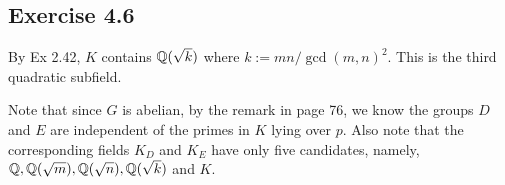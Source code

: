 \documentclass[../Marcus.tex]{subfiles}
\begin{document}
\begin{comment}
It's remaining to show that $H$ is normal in $G$. Note that for each $\sigma\in G$, $\sigma H\sigma^{-1}$ forms another subgroup with $\#(\sigma H\sigma^{-1})=\#(H)$. And by the uniqueness, we have $\sigma H\sigma^{-1}=H$. This means $H$ is normal in $G$.

Let's show the groups have the desired properties. If there are distinct prime divisors $p,q$ of $\#(G)$, then by Cauchy's theorem, $\exists \sigma,\tau\in G$ with order $p,q$, respectively. Since $H$ is the smallest subgroup, $H\subseteq \langle\sigma\rangle,\langle\tau\rangle$. This implies $\#(H)\mid p,q$ and so $\#(H)=1$, which is absurd. So $\#(G)$ is a prime power. Consequently, $H$ must have prime order. Lastly, $H\subset Z(G)$ is clear.

(e) Similar to (d), we assume there's at least one intermediate field $K'$. And let $K'$ be the compositum of all intermediate fields, $H$ be the corresponding subgroup in $G$. Since this time $P$ splits completely in every intermediate field. By Thm 31 again, $P$ splits completely in $K'$. Thus we have $K'\varsubsetneq L$. The remaining arguments are exactly the same in (d).

As an example, let $K=\QQ$ and $L=\QQ(e^{2\pi i/5})$. We know $G=(\ZZ/5\ZZ)^\times\simeq C_4$, the cyclic group of order $4$. There's only one subgroup in $C_4$, namely, $\{0,2\}$. So by Galois correspondence, there's only one intermediate field. Moreover, by Ex 2.8, we know this field is $\QQ(\sqrt{5})$. Note that the corresponding subgroup $H$ is isomorphic to $\{0,2\}$, which clearly has the desired properties.

Consider $p=11$. Since $5$ is a square mod $11$, by Thm 25 (p. 52), we have $11$ splits completely in $\QQ(\sqrt{5})$. Moreover, by Thm 26 (p. 53), $f$ is the order of $11$ in $(\ZZ/5\ZZ)^\times$, which is $2$. So $11$ does not split completely in $L=\QQ(e^{2\pi i/5})$.
\end{comment}

\subsection*{Exercise 4.6}

By Ex 2.42, $K$ contains $\mathbb{Q}(\sqrt{k})$ where $k:=mn/\gcd(m,n)^2$. This is the third quadratic subfield.

Note that since $G$ is abelian, by the remark in page 76, we know the groups $D$ and $E$ are independent of the primes in $K$ lying over $p$. Also note that the corresponding fields $K_D$ and $K_E$ have only five candidates, namely, $\mathbb{Q},\mathbb{Q}(\sqrt{m}),\mathbb{Q}(\sqrt{n}),\mathbb{Q}(\sqrt{k})$ and $K$.
\end{document}
